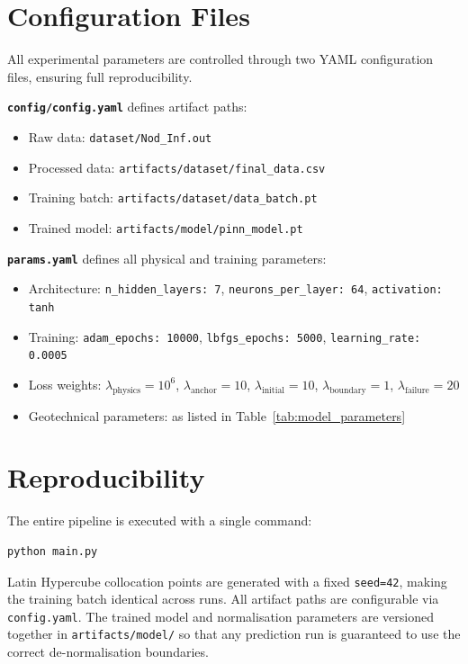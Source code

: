 \documentclass[12pt]{report}
\begin{document}
\section{Configuration Files}

All experimental parameters are controlled through two YAML
configuration files, ensuring full reproducibility.

\textbf{\texttt{config/config.yaml}} defines artifact paths:
\begin{itemize}
    \item Raw data: \texttt{dataset/Nod\_Inf.out}
    \item Processed data: \texttt{artifacts/dataset/final\_data.csv}
    \item Training batch: \texttt{artifacts/dataset/data\_batch.pt}
    \item Trained model: \texttt{artifacts/model/pinn\_model.pt}
\end{itemize}

\textbf{\texttt{params.yaml}} defines all physical and
training parameters:
\begin{itemize}
    \item Architecture: \texttt{n\_hidden\_layers: 7},
    \texttt{neurons\_per\_layer: 64}, \texttt{activation: tanh}
    \item Training: \texttt{adam\_epochs: 10000},
    \texttt{lbfgs\_epochs: 5000},
    \texttt{learning\_rate: 0.0005}
    \item Loss weights: $\lambda_{\text{physics}} = 10^6$,
    $\lambda_{\text{anchor}} = 10$,
    $\lambda_{\text{initial}} = 10$,
    $\lambda_{\text{boundary}} = 1$,
    $\lambda_{\text{failure}} = 20$
    \item Geotechnical parameters: as listed in
    Table~\ref{tab:model_parameters}
\end{itemize}

\section{Reproducibility}

The entire pipeline is executed with a single command:

\begin{verbatim}
python main.py
\end{verbatim}

Latin Hypercube collocation points are generated with a fixed
\texttt{seed=42}, making the training batch identical across runs.
All artifact paths are configurable via \texttt{config.yaml}.
The trained model and normalisation parameters are versioned
together in \texttt{artifacts/model/} so that any prediction run
is guaranteed to use the correct de-normalisation boundaries.
\end{document}
